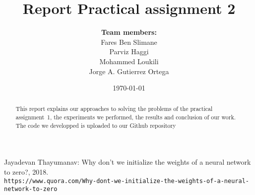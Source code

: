 \documentclass[a4paper]{article}
\title{Report Practical assignment 2}
\author{\textbf{Team members:}\\
Fares Ben Slimane \\
Parviz Haggi \\
Mohammed Loukili \\
Jorge A. Gutierrez Ortega
}
\date{\today}
\begin{document}
\maketitle

\begin{abstract}
This report explains our approaches to solving the problems of the practical assignment~1, the experiments we performed, the results and conclusion of our work. The code we developped is uploaded to our Github repository \cite{github}
\end{abstract}








 \newpage
\begin{thebibliography}{9}
  Jayadevan Thayumanav: Why don't we initialize the weights of a neural network to zero?, 2018.
  \\\texttt{https://www.quora.com/Why-dont-we-initialize-the-weights-of-a-neural-network-to-zero}

  
  
\end{thebibliography}
\end{document}
